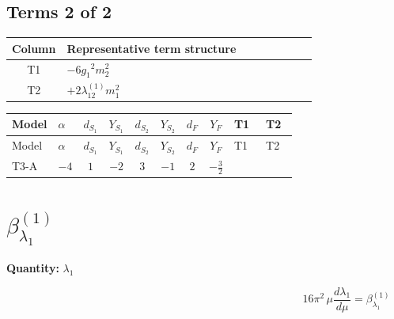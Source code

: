 \documentclass[8pt]{article}
\begin{document}
\begin{landscape}
\subsection*{Terms 2 of 2}
\begin{center}
\begin{tabular}{@{}c >{\raggedright\arraybackslash}p{0.82\linewidth}@{}}
\toprule
Column & Representative term structure \\
\midrule
T1 & \(\displaystyle -6 {g_1}^2 {m_2^2}\) \\
\midrule
T2 & \(\displaystyle +2 {\lambda_{12}^{(1)}} {m_1^2}\) \\
\midrule
\bottomrule
\end{tabular}
\end{center}
\smallskip
\tiny
\begin{longtable}{@{}llcccccc >{\raggedright\arraybackslash}p{0.21\linewidth} >{\raggedright\arraybackslash}p{0.21\linewidth}@{}}
\toprule
Model & $\alpha$ & $d_{S_1}$ & $Y_{S_1}$ & $d_{S_2}$ & $Y_{S_2}$ & $d_F$ & $Y_F$ & T1 & T2 \\
\midrule
\endfirsthead
\toprule
Model & $\alpha$ & $d_{S_1}$ & $Y_{S_1}$ & $d_{S_2}$ & $Y_{S_2}$ & $d_F$ & $Y_F$ & T1 & T2 \\
\midrule
\endhead
T3-A & $-4$ & $1$ & $-2$ & $3$ & $-1$ & $2$ & $-\frac{3}{2}$ & \scriptsize\adjustbox{max width=\linewidth}{$\begin{gathered} -6 {g_1}^2 {m_2^2}\end{gathered}$} & \scriptsize\adjustbox{max width=\linewidth}{$\begin{gathered} +2 {\lambda_{12}^{(1)}} {m_1^2}\end{gathered}$} \\
\midrule
\bottomrule
\end{longtable}
\clearpage
\section*{$\beta_{\lambda_1}^{(1)}$}
\noindent\textbf{Quantity: }$\lambda_1$\par\smallskip
\[16\pi^2\,\mu\frac{d \lambda_1}{d\mu}=\beta_{\lambda_1}^{(1)}\]

\end{landscape}
\end{document}
